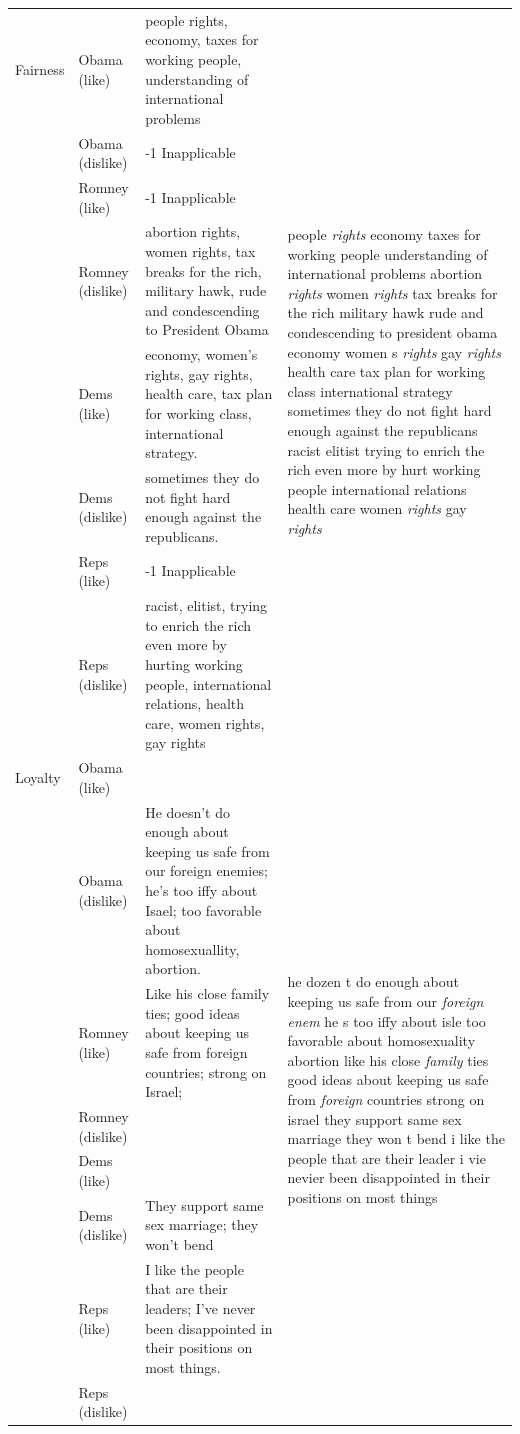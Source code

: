 \documentclass[12pt]{article}
\begin{document}
\begin{center}
\begin{longtable}{lp{1.5cm}p{5.5cm}p{5.5cm}}
	Fairness & Obama (like) & people rights, economy, taxes for working people, understanding of international problems & \multirow{8}{5.5cm}{people \textit{rights} economy taxes for working people understanding of international problems abortion \textit{rights} women \textit{rights} tax breaks for the rich military hawk rude and condescending to president obama economy women s \textit{rights} gay \textit{rights} health care tax plan for working class international strategy sometimes they do not fight hard enough against the republicans racist elitist trying to enrich the rich even more by hurt working people international relations health care women \textit{rights} gay \textit{rights}} \\
	 & Obama (dislike) & -1 Inapplicable \\
	 & Romney (like) & -1 Inapplicable \\
	 & Romney (dislike) & abortion rights, women rights, tax breaks for the rich, military hawk, rude and condescending to President Obama \\
	 & Dems (like) & economy, women's rights, gay rights, health care, tax plan for working class, international strategy. \\
	 & Dems (dislike) & sometimes they do not fight hard enough against the republicans. \\
	 & Reps (like) & -1 Inapplicable \\
	 & Reps (dislike) & racist, elitist, trying to enrich the rich even more by hurting working people, international relations, health care, women rights, gay rights \\ \hline	
	
	Loyalty & Obama (like) &  & \multirow{8}{5.5cm}{he dozen t do enough about keeping us safe from our \textit{foreign} \textit{enem} he s too iffy about isle too favorable about homosexuality abortion like his close \textit{family} ties good ideas about keeping us safe from \textit{foreign} countries strong on israel they support same sex marriage they won t bend i like the people that are their leader i vie nevier been disappointed in their positions on most things} \\
	 & Obama (dislike) & He doesn't do enough about keeping us safe from our foreign enemies; he's too iffy about Isael; too favorable about homosexuallity, abortion. \\
	 & Romney (like) & Like his close family ties; good ideas about keeping us safe from foreign countries; strong on Israel; \\
	 & Romney (dislike) &  \\
	 & Dems (like) &  \\
	 & Dems (dislike) & They support same sex marriage; they won't bend \\
	 & Reps (like) & I like the people that are their leaders; I've never been disappointed in their positions on most things. \\
	 & Reps (dislike) &  \\ \hline
	 

\end{longtable}
\end{center}
\end{document}
